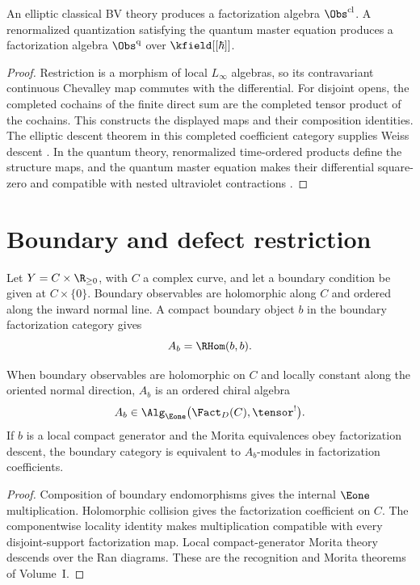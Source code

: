 \begin{theorem}
An elliptic classical BV theory produces a factorization algebra $\Obs^{\mathrm{cl}}$. A renormalized quantization satisfying the quantum master equation produces a factorization algebra $\Obs^{\mathrm{q}}$ over $\kfield[[\hbar]]$.
\end{theorem}
\begin{proof}
Restriction is a morphism of local $L_\infty$ algebras, so its
contravariant continuous Chevalley map commutes with the differential.
For disjoint opens, the completed cochains of the finite direct sum
are the completed tensor product of the cochains. This constructs
the displayed maps and their composition identities.
The elliptic descent theorem in this completed coefficient category
supplies Weiss descent \cite{CG1,CG2}. In the quantum theory, renormalized time-ordered products define the structure maps, and the quantum master equation makes their differential square-zero and compatible with nested ultraviolet contractions \cite{CG1,CG2}.
\end{proof}

\section{Boundary and defect restriction}
Let $Y=C\times\R_{\ge0}$, with $C$ a complex curve, and let a boundary condition be given at $C\times\{0\}$. Boundary observables are holomorphic along $C$ and ordered along the inward normal line. A compact boundary object $b$ in the boundary factorization category gives
\[
 A_b=\RHom(b,b).
\]

\begin{theorem}
When boundary observables are holomorphic on $C$ and locally constant along the oriented normal direction, $A_b$ is an ordered chiral algebra
\[
 A_b\in\Alg_{\Eone}\bigl(\Fact_D(C),\tensor^!\bigr).
\]
If $b$ is a local compact generator and the Morita equivalences obey factorization descent, the boundary category is equivalent to $A_b$-modules in factorization coefficients.
\end{theorem}
\begin{proof}
Composition of boundary endomorphisms gives the internal $\Eone$ multiplication. Holomorphic collision gives the factorization coefficient on $C$. The componentwise locality identity makes multiplication compatible with every disjoint-support factorization map. Local compact-generator Morita theory descends over the Ran diagrams. These are the recognition and Morita theorems of Volume~I.
\end{proof}


